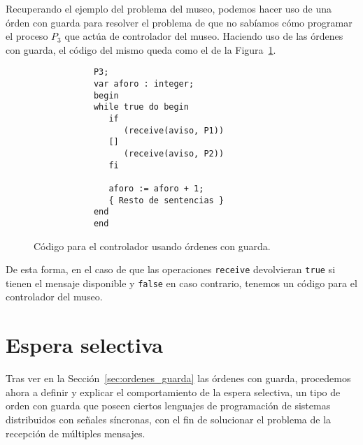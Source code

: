 \begin{ejemplo}
    Recuperando el ejemplo del problema del museo, podemos hacer uso de una órden con guarda para resolver el problema de que no sabíamos cómo programar el proceso $P_3$ que actúa de controlador del museo. Haciendo uso de las órdenes con guarda, el código del mismo queda como el de la Figura~\ref{fig:cod_museo_guarda}.
    \begin{figure}
        \centering
        \begin{verbatim}
            P3;
            var aforo : integer;
            begin
            while true do begin
               if
                  (receive(aviso, P1))
               []
                  (receive(aviso, P2))
               fi

               aforo := aforo + 1;
               { Resto de sentencias }
            end
            end
        \end{verbatim}
        \caption{Código para el controlador usando órdenes con guarda.}
        \label{fig:cod_museo_guarda}
    \end{figure}
    De esta forma, en el caso de que las operaciones \verb|receive| devolvieran \verb|true| si tienen el mensaje disponible y \verb|false| en caso contrario, tenemos un código para el controlador del museo.
\end{ejemplo}

\section{Espera selectiva}
Tras ver en la Sección~\ref{sec:ordenes_guarda} las órdenes con guarda, procedemos ahora a definir y explicar el comportamiento de la espera selectiva, un tipo de orden con guarda que poseen ciertos lenguajes de programación de sistemas distribuidos con señales síncronas, con el fin de solucionar el problema de la recepción de múltiples mensajes.

